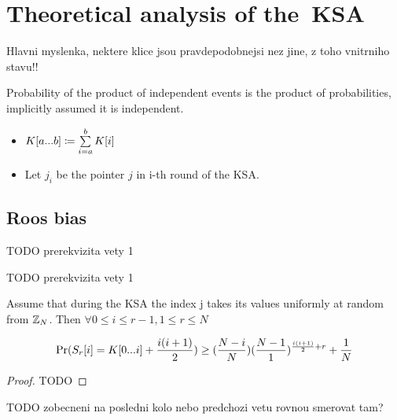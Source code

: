 \chapter{Theoretical analysis of the~KSA}

Hlavni myslenka, nektere klice jsou pravdepodobnejsi nez jine, z toho vnitrniho stavu!! 







\begin{thm}
	Probability of the product of independent events is the product of probabilities, implicitly assumed it is independent. 
\end{thm}


\begin{notation}
	
	\begin{itemize}
		\item 	$ K[{a}...{b}] \coloneqq \sum\limits_{i=a}^{b}K[i]$
		
		\item 	Let $ j_{i} $ be the pointer $ j $ in i-th round of the KSA. 
	\end{itemize}
	
\end{notation}

\section{Roos bias}
	\begin{lemma}
		TODO prerekvizita vety 1
	\end{lemma}
	
	\begin{lemma}
		TODO prerekvizita vety 1
	\end{lemma}
	
	
	\begin{thm}{\cite{GoMa}}
		Assume that during the KSA the index j takes its values uniformly at random from $ \mathbb{Z}_{N} $. Then $ \forall 0 \leq i \leq r-1, 1 \leq r \leq N $
		
		\[ \Pr(S_{r}[i] = K[{0}...{i}] + \dfrac{i(i+1)}{2})   \geq (\dfrac{N - i}{N})(\dfrac{N-1}{1})^{\frac{i(i+1)}{2}+r}+\dfrac{1}{N} \]
	\end{thm}
	
	\begin{proof}
		TODO
	\end{proof}
	
	\begin{cor}
		TODO zobecneni na posledni kolo nebo predchozi vetu rovnou smerovat tam?
\end{cor}
	
